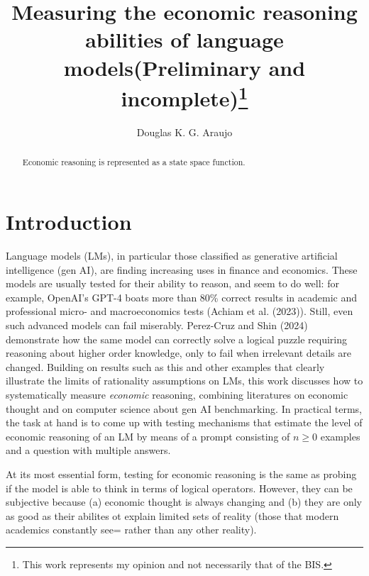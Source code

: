 \documentclass[
]{article}
\title{Measuring the economic reasoning abilities of language
models\newline(Preliminary and incomplete)\thanks{This work represents
my opinion and not necessarily that of the BIS.}}
\author{Douglas K. G. Araujo}
\affil{%
                  Bank for International
Settlements, douglas.araujo@bis.org
              }
\date{}
\begin{document}
\maketitle
\begin{abstract}
Economic reasoning is represented as a state space function.
\end{abstract}
\ifdefined\Shaded\renewenvironment{Shaded}{\begin{tcolorbox}[boxrule=0pt, interior hidden, borderline west={3pt}{0pt}{shadecolor}, frame hidden, breakable, enhanced, sharp corners]}{\end{tcolorbox}}\fi

\hypertarget{introduction}{%
\section{Introduction}\label{introduction}}

Language models (LMs), in particular those classified as generative
artificial intelligence (gen AI), are finding increasing uses in finance
and economics. These models are usually tested for their ability to
reason, and seem to do well: for example, OpenAI's GPT-4 boats more than
80\% correct results in academic and professional micro- and
macroeconomics tests (Achiam et al. (2023)). Still, even such advanced
models can fail miserably. Perez-Cruz and Shin (2024) demonstrate how
the same model can correctly solve a logical puzzle requiring reasoning
about higher order knowledge, only to fail when irrelevant details are
changed. Building on results such as this and other examples that
clearly illustrate the limits of rationality assumptions on LMs, this
work discusses how to systematically measure \emph{economic} reasoning,
combining literatures on economic thought and on computer science about
gen AI benchmarking. In practical terms, the task at hand is to come up
with testing mechanisms that estimate the level of economic reasoning of
an LM by means of a prompt consisting of \(n \geq 0\) examples and a
question with multiple answers.

At its most essential form, testing for economic reasoning is the same
as probing if the model is able to think in terms of logical operators.
However, they can be subjective because (a) economic thought is always
changing and (b) they are only as good as their abilites ot explain
limited sets of reality (those that modern academics constantly see=
rather than any other reality).
\end{document}
